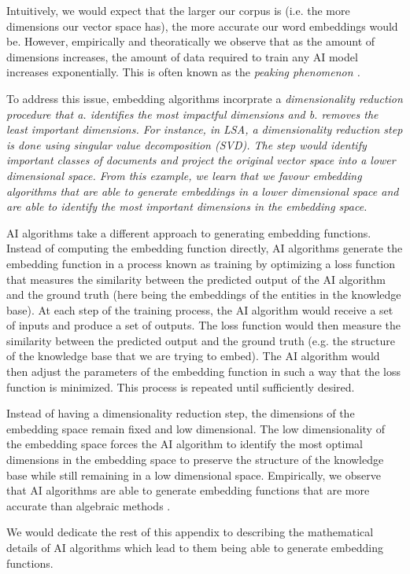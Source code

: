 Intuitively, we would expect that the larger our corpus is (i.e. the more dimensions our vector space has),
the more accurate our word embeddings would be.
However, empirically and theoratically we observe that as the amount of dimensions
increases, the amount of data required to train any AI model increases exponentially.
This is often known as the \it{peaking phenomenon} \cite{ThePeakingPhenomenon}.

To address this issue, embedding algorithms incorprate
a \it{dimensionality reduction} procedure that a. identifies the most impactful dimensions and 
b. removes the least important dimensions.
For instance, in LSA, a dimensionality reduction step is done using singular value decomposition (SVD).
The step would identify important classes of documents and project the original 
vector space into a lower dimensional space. From this example, we learn that we favour embedding algorithms that are able to generate embeddings in a lower dimensional space
and are able to identify the most important dimensions in the embedding space.

AI algorithms take a different approach to generating embedding functions.
Instead of computing the embedding function directly, AI algorithms generate the embedding function in a process known as training
by optimizing a loss function that measures the similarity between the predicted output of the AI algorithm and the ground truth
(here being the embeddings of the entities in the knowledge base).
At each step of the training process, the AI algorithm would
receive a set of inputs and produce a set of outputs. The loss function would then measure the similarity between the predicted output and the ground truth
(e.g. the structure of the knowledge base that we are trying to embed).
The AI algorithm would then adjust the parameters of the embedding function in such a way that the loss function is minimized.
This process is repeated until sufficiently desired.

Instead of having a dimensionality reduction step, the dimensions of the embedding space remain fixed and low dimensional.
The low dimensionality of the embedding space forces the AI algorithm to identify the most optimal dimensions in the embedding space
to preserve the structure of the knowledge base while still remaining in a low dimensional space.
Empirically, we observe that AI algorithms are able to generate embedding functions that are more accurate than algebraic methods \cite{SurveryKG}.

We would dedicate the rest of this appendix to describing the mathematical details of AI algorithms which lead to them being able to generate embedding functions.